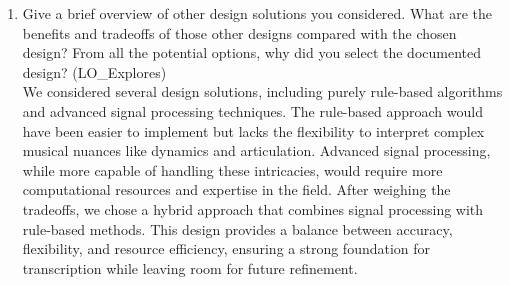 \documentclass[12pt, titlepage]{article}
\begin{document}
\begin{enumerate}
  \item Give a brief overview of other design solutions you considered. What
  are the benefits and tradeoffs of those other designs compared with the chosen
  design?  From all the potential options, why did you select the documented design?
  (LO\_Explores) \\

    We considered several design solutions, including purely rule-based algorithms and advanced signal processing 
    techniques. The rule-based approach would have been easier to implement but lacks the flexibility to interpret 
    complex musical nuances like dynamics and articulation. Advanced signal processing, while more capable of handling 
    these intricacies, would require more computational resources and expertise in the field. After weighing the 
    tradeoffs, we chose a hybrid approach that combines signal processing with rule-based methods. This design provides 
    a balance between accuracy, flexibility, and resource efficiency, ensuring a strong foundation for transcription 
    while leaving room for future refinement.

\end{enumerate}
\end{document}
